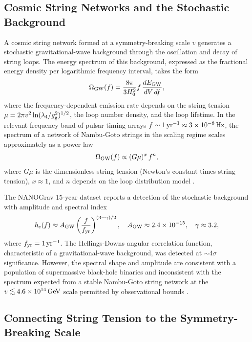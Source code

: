 \documentclass[12pt,a4paper]{article}
\begin{document}
\subsection{Cosmic String Networks and the Stochastic Background}

A cosmic string network formed at a symmetry-breaking scale $v$ generates a
stochastic gravitational-wave background through the oscillation and decay of
string loops. The energy spectrum of this background, expressed as the
fractional energy density per logarithmic frequency interval, takes the form
\cite{NANOGrav2023,Maggiore2008}
\begin{equation}
\Omega_{\rm GW}(f)
= \frac{8\pi}{3H_0^2}f\,\frac{dE_{\rm GW}}{dV\,df},
\end{equation}
where the frequency-dependent emission rate depends on the string tension
$\mu = 2\pi v^2\ln(\lambda_4/g_{\rm g}^2)^{1/2}$, the loop number density, and
the loop lifetime. In the relevant frequency band of pulsar timing arrays
$f \sim 1\,{\rm yr}^{-1} \approx 3\times 10^{-8}\,{\rm Hz}$, the spectrum
of a network of Nambu-Goto strings in the scaling regime scales approximately
as a power law
\begin{equation}
\Omega_{\rm GW}(f) \propto (G\mu)^{x}\,f^{n},
\end{equation}
where $G\mu$ is the dimensionless string tension (Newton's constant times string
tension), $x \approx 1$, and $n$ depends on the loop distribution model
\cite{NANOGrav2023}.

The NANOGrav 15-year dataset reports a detection of the stochastic background
with amplitude and spectral index \cite{NANOGrav2023}
\begin{equation}
h_c(f) \approx A_{\rm GW}\left(\frac{f}{f_{\rm yr}}\right)^{(3-\gamma)/2},
\quad A_{\rm GW} \approx 2.4\times 10^{-15},
\quad \gamma \approx 3.2,
\end{equation}
where $f_{\rm yr} = 1\,{\rm yr}^{-1}$. The Hellings-Downs angular correlation
function, characteristic of a gravitational-wave background, was detected at
$\sim 4\sigma$ significance. However, the spectral shape and amplitude are
consistent with a population of supermassive black-hole binaries and
inconsistent with the spectrum expected from a stable Nambu-Goto string
network at the $v \lesssim 4.6\times 10^{14}\,{\rm GeV}$ scale permitted by
observational bounds \cite{NANOGrav2023,EichhornLinoMiqueleto2023}.

\subsection{Connecting String Tension to the Symmetry-Breaking Scale}
\end{document}
